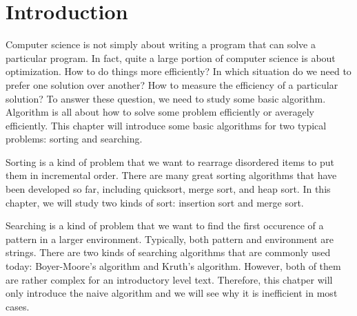 \documentclass[../main.tex]{subfiles}
\begin{document}
    \section{Introduction}
    Computer science is not simply about writing a program that can solve a
    particular program. In fact, quite a large portion of computer science is
    about optimization. How to do things more efficiently? In which situation do
    we need to prefer one solution over another? How to measure the efficiency
    of a particular solution? To answer these question, we need to study some
    basic algorithm. Algorithm is all about how to solve some problem
    efficiently or averagely efficiently. This chapter will introduce some basic
    algorithms for two typical problems: sorting and searching.

    Sorting is a kind of problem that we want to rearrage disordered items to
    put them in incremental order. There are many great sorting algorithms that
    have been developed so far, including quicksort, merge sort, and heap sort.
    In this chapter, we will study two kinds of sort: insertion sort and merge
    sort.

    Searching is a kind of problem that we want to find the first occurence of
    a pattern in a larger environment. Typically, both pattern and environment
    are strings. There are two kinds of searching algorithms that are commonly
    used today: Boyer-Moore's algorithm and Kruth's algorithm. However, both of
    them are rather complex for an introductory level text. Therefore, this
    chatper will only introduce the naive algorithm and we will see why it is
    inefficient in most cases.
\end{document}

